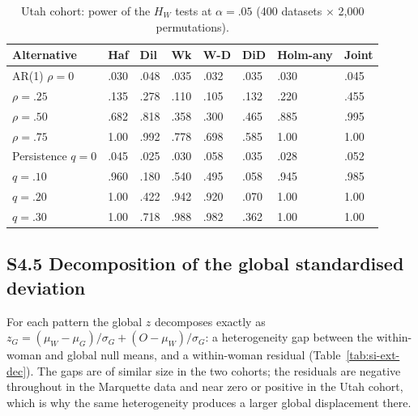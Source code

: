 \documentclass[12pt]{article}
\newcommand{\HW}{H_{W}}
\begin{document}
\begin{table}[!htbp]
\centering
\caption{Utah cohort: power of the $\HW$ tests at $\alpha = .05$ (400 datasets $\times$
  2,000 permutations).}
\label{tab:si-ext-power}
\smallskip
\small
\begin{tabular}{L{3.0cm} C{1.1cm} C{1.1cm} C{1.1cm} C{1.1cm} C{1.1cm} C{1.6cm} C{1.2cm}}
\toprule
\textbf{Alternative} & \textbf{Haf} & \textbf{Dil} & \textbf{Wk} & \textbf{W-D} & \textbf{DiD} & \textbf{Holm-any} & \textbf{Joint} \\
\midrule
AR(1) $\rho = 0$      & .030 & .048 & .035 & .032 & .035 & .030 & .045 \\
$\rho = .25$          & .135 & .278 & .110 & .105 & .132 & .220 & .455 \\
$\rho = .50$          & .682 & .818 & .358 & .300 & .465 & .885 & .995 \\
$\rho = .75$          & 1.00 & .992 & .778 & .698 & .585 & 1.00 & 1.00 \\
Persistence $q = 0$   & .045 & .025 & .030 & .058 & .035 & .028 & .052 \\
$q = .10$             & .960 & .180 & .540 & .495 & .058 & .945 & .985 \\
$q = .20$             & 1.00 & .422 & .942 & .920 & .070 & 1.00 & 1.00 \\
$q = .30$             & 1.00 & .718 & .988 & .982 & .362 & 1.00 & 1.00 \\
\bottomrule
\end{tabular}
\end{table}

\subsection*{S4.5 Decomposition of the global standardised deviation}

For each pattern the global $z$ decomposes exactly as
$z_G = (\mu_W - \mu_G)/\sigma_G + (O - \mu_W)/\sigma_G$: a heterogeneity gap between the
within-woman and global null means, and a within-woman residual (Table~\ref{tab:si-ext-dec}).
The gaps are of similar size in the two cohorts; the residuals are negative throughout in
the Marquette data and near zero or positive in the Utah cohort, which is why the same
heterogeneity produces a larger global displacement there.
\end{document}
